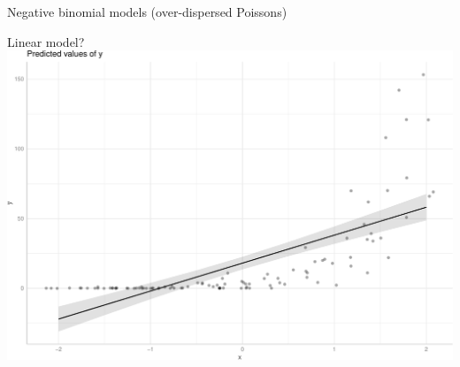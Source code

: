 \documentclass[
  ignorenonframetext,
]{beamer}
\begin{document}
\begin{frame}[fragile]{Negative binomial models (over-dispersed
Poissons)}
\begin{block}{Linear model?}
\protect\hypertarget{linear-model}{}
\includegraphics{slides_files/figure-beamer/unnamed-chunk-45-1.pdf}
\end{block}
\end{frame}
\end{document}
